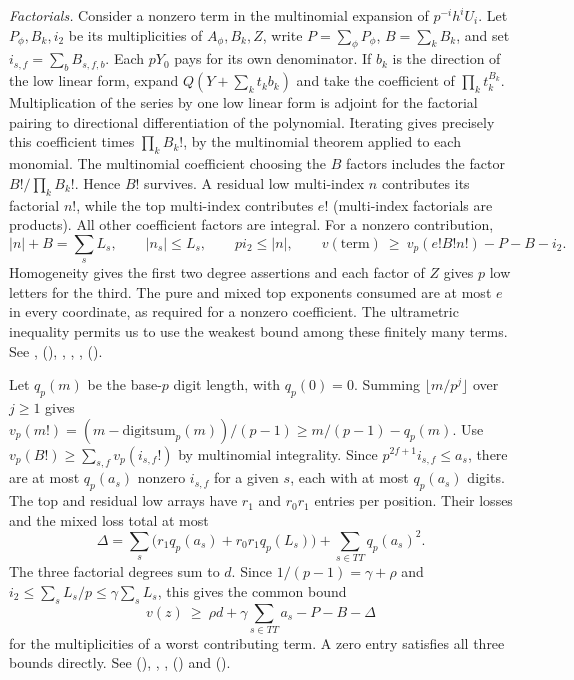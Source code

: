 \emph{Factorials.} Consider a nonzero term in the multinomial expansion
of $p^{-i}h^iU_i$. Let $P_\phi,B_k,i_2$ be its multiplicities of
$A_\phi,B_k,Z$, write $P=\sum_\phi P_\phi$, $B=\sum_k B_k$, and set
$i_{s,f}=\sum_bB_{s,f,b}$. Each $pY_0$ pays for its own denominator.
If $b_k$ is the direction of the low linear form, expand
$Q(Y+\sum_k t_k b_k)$ and take the coefficient of $\prod_k t_k^{B_k}$.
Multiplication of the series by one low linear form is adjoint for the
factorial pairing to directional differentiation of the polynomial.
Iterating gives precisely this coefficient times $\prod_k B_k!$, by
the multinomial theorem applied to each monomial. The multinomial
coefficient choosing the $B$ factors includes the factor
$B!/\prod_k B_k!$. Hence $B!$ survives. A residual low multi-index
$n$ contributes its factorial $n!$, while the top multi-index contributes
$e!$ (multi-index factorials are products). All other coefficient factors
are integral. For a nonzero contribution,
\[
 |n|+B=\sum_sL_s,\qquad |n_s|\le L_s,\qquad pi_2\le |n|,
 \qquad v(\text{term})\ \ge\ v_p(e!B!n!)-P-B-i_2 .
\]
Homogeneity gives the first two degree assertions and each factor of $Z$
gives $p$ low letters for the third. The pure and mixed top exponents
consumed are at most $e$ in every coordinate, as required for a nonzero
coefficient. The ultrametric inequality permits us to use the weakest
bound among these finitely many terms. See ,
 (),
, , , 
().

Let $q_p(m)$ be the base-$p$ digit length, with $q_p(0)=0$. Summing
$\lfloor m/p^j\rfloor$ over $j\ge1$ gives
$v_p(m!)=(m-\mathrm{digitsum}_p(m))/(p-1)\ge m/(p-1)-q_p(m)$.
Use $v_p(B!)\ge\sum_{s,f}v_p(i_{s,f}!)$ by multinomial integrality.
Since $p^{2f+1}i_{s,f}\le a_s$, there are at most $q_p(a_s)$ nonzero
$i_{s,f}$ for a given $s$, each with at most $q_p(a_s)$ digits.
The top and residual low arrays have $r_1$ and $r_0 r_1$ entries per
position. Their losses and the mixed loss total at most
\[
 \Delta=\sum_s\bigl(r_1q_p(a_s)+r_0r_1q_p(L_s)\bigr)
                +\sum_{s\in TT}q_p(a_s)^2 .
\]
The three factorial degrees sum to $d$. Since $1/(p-1)=\gamma+\rho$
and $i_2\le\sum_sL_s/p\le\gamma\sum_sL_s$, this gives the common bound
\[
        v(z)\ \ge\ \rho d+\gamma\sum_{s\in TT}a_s-P-B-\Delta
        \tag{*}
\]
for the multiplicities of a worst contributing term. A zero entry
satisfies all three bounds directly. See 
(), ,
, 
() and 
().

